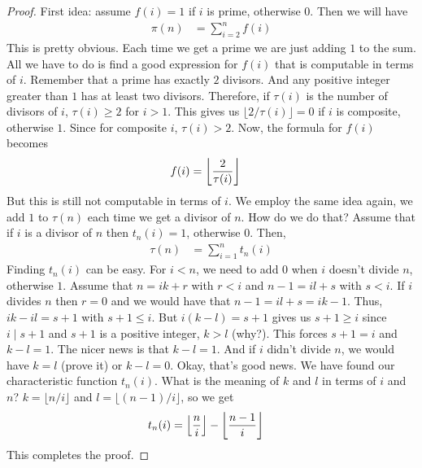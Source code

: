\documentclass{subfiles}
\begin{document}
			\begin{proof}
				First idea: assume $f(i)=1$ if $i$ is prime, otherwise $0$. Then we will have
					\begin{align*}
						\pi(n) & = \sum_{i=2}^{n}f(i)
					\end{align*}
				This is pretty obvious. Each time we get a prime we are just adding $1$ to the sum. All we have to do is find a good expression for $f(i)$ that is computable in terms of $i$. Remember that  a prime has exactly $2$ divisors. And any positive integer greater than $1$ has at least two divisors. Therefore, if $\tau(i)$ is the number of divisors of $i$, $\tau(i)\geq2$ for $i>1$. This gives us $\lfloor 2/\tau(i)\rfloor=0$ if $i$ is composite, otherwise $1$. Since for composite $i$, $\tau(i)>2$. Now, the formula for $f(i)$ becomes
					\begin{align*}
						f(i) & = \floor{\dfrac{2}{\tau(i)}}
					\end{align*}
				But this is still not computable in terms of $i$. We employ the same idea again, we add $1$ to $\tau(n)$ each time we get a divisor of $n$. How do we do that? Assume that if $i$ is a divisor of $n$ then $t_n(i)=1$, otherwise $0$. Then,
					\begin{align*}
						\tau(n) & = \sum_{i=1}^{n}t_n(i)
					\end{align*}
				Finding $t_n(i)$ can be easy. For $i<n$, we need to add $0$ when $i$ doesn't divide $n$, otherwise $1$. Assume that $n=ik+r$ with $r<i$ and $n-1=il+s$ with $s<i$. If $i$ divides $n$ then $r=0$ and we would have that $n-1=il+s=ik-1$. Thus, $ik-il=s+1$ with $s+1\leq i$. But $i(k-l)=s+1$ gives us $s+1\geq i$ since $i\mid s+1$ and $s+1$ is a positive integer, $k>l$ (why?). This forces $s+1=i$ and $k-l=1$. The nicer news is that $k-l=1$. And if $i$ didn't divide $n$, we would have $k=l$ (prove it) or $k-l=0$. Okay, that's good news. We have found our characteristic function $t_n(i)$. What is the meaning of $k$ and $l$ in terms of $i$ and $n$? $k=\lfloor n/i\rfloor$ and $l=\lfloor (n-1)/i\rfloor$, so we get
					\begin{align*}
						t_n(i) & = \floor{\dfrac{n}{i}}-\floor{\dfrac{n-1}{i}}
					\end{align*}
				This completes the proof.
			\end{proof}
\end{document}
